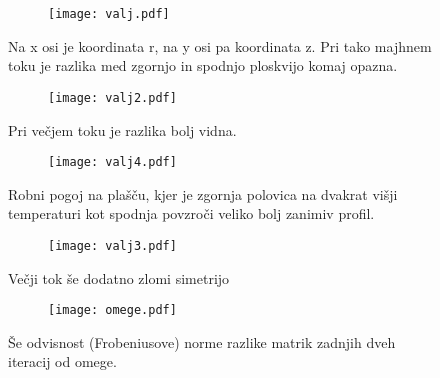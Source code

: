 \documentclass{article}
\begin{document}
\begin{figure}[H]
\centering
\begin{subfigure}{.8\textwidth}
\texttt{[image: valj.pdf]}
\end{subfigure}
\caption*{Na x osi je koordinata r, na y osi pa koordinata z. Pri tako majhnem toku je razlika med zgornjo in spodnjo ploskvijo komaj opazna.}
\end{figure}

\begin{figure}[H]
\centering
\begin{subfigure}{.8\textwidth}
\texttt{[image: valj2.pdf]}
\end{subfigure}
\caption*{Pri večjem toku je razlika bolj vidna.}
\end{figure}

\begin{figure}[H]
\centering
\begin{subfigure}{.8\textwidth}
\texttt{[image: valj4.pdf]}
\end{subfigure}
\caption*{Robni pogoj na plašču, kjer je zgornja polovica na dvakrat višji temperaturi kot spodnja povzroči veliko bolj zanimiv profil.}
\end{figure}

\begin{figure}[H]
\centering
\begin{subfigure}{.8\textwidth}
\texttt{[image: valj3.pdf]}
\end{subfigure}
\caption*{Večji tok še dodatno zlomi simetrijo}
\end{figure}
\begin{figure}[H]
\centering
\begin{subfigure}{.8\textwidth}
\texttt{[image: omege.pdf]}
\end{subfigure}
\caption*{Še odvisnost (Frobeniusove) norme razlike matrik zadnjih dveh iteracij od omege.}
\end{figure}
\end{document}
